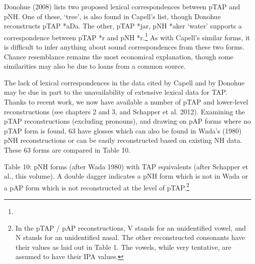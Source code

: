 Donohue (2008) lists two proposed lexical correspondences between pTAP and pNH. One of these, {\textquoteleft}tree{\textquoteright}, is also found in Capell{\textquoteright}s list, though Donohue reconstructs pTAP *aDa. The other, pTAP *jar, pNH *aker {\textquoteleft}water{\textquoteright} supports a correspondence between pTAP *r and pNH *r.\footnote{  }\textsuperscript{ } As with Capell{\textquoteright}s similar forms, it is difficult to infer anything about sound correspondences from these two forms. Chance resemblance remains the most economical explanation, though some similarities may also be due to loans from a common source.

The lack of lexical correspondences in the data cited by Capell and by Donohue may be due in part to the unavailability of extensive lexical data for TAP. Thanks to recent work, we now have available a number of pTAP and lower-level reconstructions (see chapters 2 and 3, and Schapper et al. 2012). Examining the pTAP reconstructions (excluding pronouns), and drawing on pAP forms where no pTAP form is found, 63 have glosses which can also be found in Wada{\textquoteright}s (1980) pNH reconstructions or can be easily reconstructed based on existing NH data. These 63 forms are compared in Table 10. 

{\centering
Table 10: pNH forms (after Wada 1980) with TAP equivalents (after Schapper et al., this volume). A double dagger {\ddag} indicates a pNH form which is not in Wada or a pAP form which is not reconstructed at the level of pTAP.\footnote{ In the pTAP / pAP reconstructions, V stands for an unidentified vowel, and N stands for an unidentified nasal. The other reconstructed consonants have their values as laid out in Table 1. The vowels, while very tentative, are assumed to have their IPA values. }
\par}

